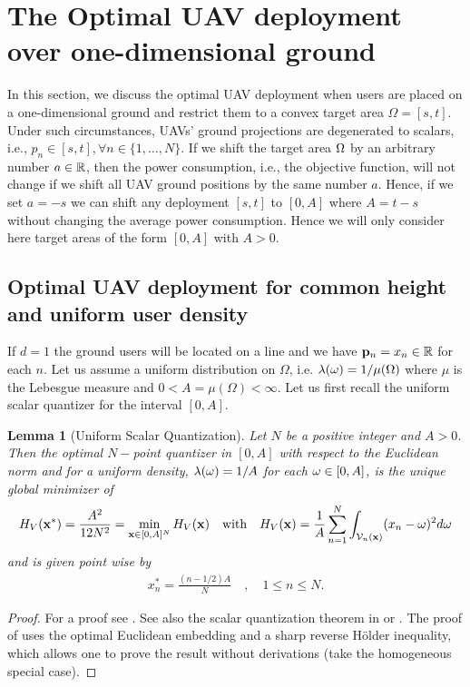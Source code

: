 \documentclass[smallabstract,smallcaptions]{dccpaper}
\newtheorem{lemma}{Lemma}
\newcommand{\df}{\ensuremath{\lam}}         %
\newcommand{\Vor}{\ensuremath{\mathcal{V}}}         %
\newcommand{\philippstart}{\color{black}}
\newcommand{\philippend}{\color{black}}
\begin{document}
\section{The Optimal UAV deployment over one-dimensional ground}

In this section, we discuss the optimal UAV deployment when users are placed on a one-dimensional ground and restrict
them to a convex target area $\Omega = [s,t]$.  Under such circumstances, UAVs' ground projections are degenerated to
scalars, i.e., $p_n\in[s, t], \forall n\in\{1, \dots, N\}$.
\philippstart
If we shift the target area $\Omega$ by an arbitrary number
$a\in{\ensuremath{\mathbb R}}$, then the power consumption, i.e., the objective function, will not change if we shift all UAV ground
positions by the same number $a$. Hence, if we set $a=-s$ we can shift any deployment $[s,t]$ to $[0,A]$ where $A=t-s$
without changing the average power consumption. Hence we will only consider here target areas of the
form $[0,A]$ with $A>0$.
\philippend

\subsection{Optimal UAV deployment for common height and uniform user density}

If $d=1$ the ground users will be located on a line and we have ${\mathbf p}_n=x_n\in{\ensuremath{\mathbb R}}$ for each $n$. Let us assume a uniform
distribution on $\Omega$, i.e.  $\df(\ome)=1/\mu(\Omega)$ where $\mu$ is the Lebesgue measure and
$0<A=\mu(\Omega)<\infty$.  Let us first recall the uniform scalar quantizer for the interval $[0,A]$.
%
\begin{lemma}[Uniform Scalar Quantization]\label{lem:UniformScalarQuantizer}
  Let $N$ be a positive integer and $A>0$. Then the optimal $N-$point quantizer in $[0,A]$ with respect to the
  Euclidean norm and for a uniform density, $\lambda(\omega)=1/A$ for each $\omega\in[0,A]$,  is the unique global minimizer of
  \begin{align}
    H_V(\vx^*)=\frac{A^2}{12N^2}=\min_{\vx\in[0,A]^N} H_V(\vx) 
       \quad\text{with}\quad H_V(\vx)=\frac{1}{A}\sum_{n=1}^N \int_{\Vor_n(\vx)} (x_n-\ome)^2d\ome
  \end{align}
  and is given point wise by
  \begin{align}
    x_n^*= \frac{(n-1/2)A}{N} \quad, \quad 1\leq n\leq N.
  \end{align}
\end{lemma}
%
\begin{proof}
  For a  proof see  .  See also  the scalar quantization theorem in \cite{GN98} or
  \cite{KJ17}.  The proof of \cite[Thm.1]{KJ17} uses the optimal
  Euclidean  embedding and a sharp reverse Hölder inequality, which allows one to prove the result without derivations (take
  the homogeneous special case). 
\end{proof}
 
\end{document}
